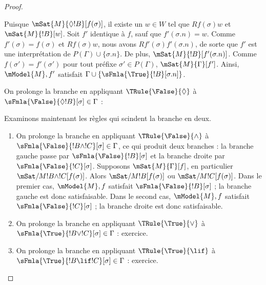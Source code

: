\documentclass[../../../include/open-logic-section]{subfiles}
\begin{document}
\begin{proof}
\begin{enumerate}
{{  Puisque $\mSat{M}{\Diamond !B}[f(\sigma)]$, il existe un $w \in W$ tel que
  $Rf(\sigma)w$ et $\mSat{M}{!B}[w]$. Soit $f'$ identique à $f$, sauf
  que $f'(\sigma.n) = w$. Comme $f'(\sigma) = f(\sigma)$ et
  $Rf(\sigma)w$, nous avons $Rf'(\sigma)f'(\sigma.n)$, de sorte que $f'$
  est une interprétation de $P(\Gamma) \cup \{\sigma.n\}$. De plus,
  $\mSat{M}{!B}[f'(\sigma.n)]$. Comme $f(\sigma') = f'(\sigma')$ pour
  tout préfixe $\sigma' \in P(\Gamma)$, $\mSat{M}{\Gamma}[f']$. Ainsi,
  $\mModel{M}, f'$ satisfait $\Gamma \cup
  \{\sFmla{\True}{!B}[\sigma.n]\}$.}
\item On prolonge la branche en appliquant $\TRule{\False}{\Diamond}$ à
  $\sFmla{\False}{\Diamond !B}[\sigma] \in \Gamma$ :
  }{}
\end{enumerate}
Examinons maintenant les règles qui scindent la branche en deux.
\begin{enumerate}
\item On prolonge la branche en appliquant $\TRule{\False}{\land}$ à
  $\sFmla{\False}{!B \land !C}[\sigma] \in \Gamma$, ce qui produit
  deux branches : la branche gauche passe par
  $\sFmla{\False}{!B}[\sigma]$ et la branche droite par
  $\sFmla{\False}{!C}[\sigma]$. Supposons $\mSat{M}{\Gamma}[f]$, en
  particulier $\mSat/{M}{!B \land !C}[f(\sigma)]$. Alors
  $\mSat/{M}{!B}[f(\sigma)]$ ou $\mSat/{M}{!C}[f(\sigma)]$. Dans le
  premier cas, $\mModel{M}, f$ satisfait $\sFmla{\False}{!B}[\sigma]$ ;
  la branche gauche est donc satisfaisable. Dans le second cas,
  $\mModel{M}, f$ satisfait $\sFmla{\False}{!C}[\sigma]$ ; la branche
  droite est donc satisfaisable.
\item On prolonge la branche en appliquant $\TRule{\True}{\lor}$ à
    $\sFmla{\True}{!B \lor !C}[\sigma] \in \Gamma$ : exercice.
\item On prolonge la branche en appliquant $\TRule{\True}{\lif}$ à
    $\sFmla{\True}{!B \lif !C}[\sigma] \in \Gamma$ : exercice.
\end{enumerate}
 \end{proof}
\end{document}
